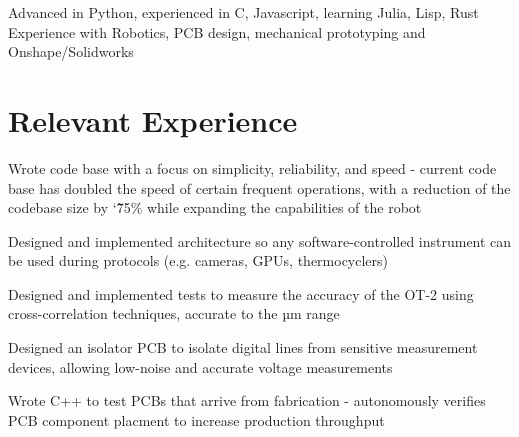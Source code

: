\documentclass[]{deedy-resume-openfont}
\begin{document}

\begin{minipage}[t]{\textwidth}
	 Advanced in Python, experienced in C, Javascript, learning Julia, Lisp, Rust\\
   Experience with Robotics, PCB design, mechanical prototyping and Onshape/Solidworks
\end{minipage}

\vspace{12pt}

\section{Relevant Experience}

\begin{tightemize}
    \item Wrote code base with a focus on simplicity, reliability, and speed - current code base has doubled the speed of certain frequent operations, with a reduction of the codebase size by \char`\~ 75\% while expanding the capabilities of the robot
    \item Designed and implemented architecture so any software-controlled instrument can be used during protocols (e.g. cameras, GPUs, thermocyclers)
    \item Designed and implemented tests to measure the accuracy of the OT-2 using cross-correlation techniques, accurate to the µm range
\end{tightemize}

\vspace{8pt}

\begin{tightemize}
    \item Designed an isolator PCB to isolate digital lines from sensitive measurement devices, allowing low-noise and accurate voltage measurements
    \item Wrote C++ to test PCBs that arrive from fabrication - autonomously verifies PCB component placment to increase production throughput
\end{tightemize}
\end{document}
